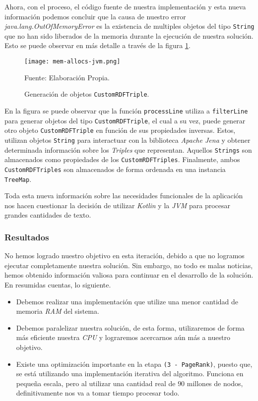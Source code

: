 Ahora, con el proceso, el código fuente de nuestra implementación y esta nueva información podemos concluir que la causa de nuestro error \textit{java.lang.OutOfMemoryError} es la existencia de multiples objetos del tipo \texttt{String} que no han sido liberados de la memoria durante la ejecución de nuestra solución. Esto se puede observar en más detalle a través de la figura \ref{fig:i2-prof-mem-allocs}.

\begin{figure}[ht]
    \centering
    \texttt{[image: mem-allocs-jvm.png]}
    \caption{Generación de objetos \texttt{CustomRDFTriple}.}Fuente: Elaboración Propia.
    \label{fig:i2-prof-mem-allocs}
\end{figure}

En la figura se puede observar que la función \texttt{processLine} utiliza a \texttt{filterLine} para generar objetos del tipo \texttt{CustomRDFTriple}, el cual a su vez, puede generar otro objeto \texttt{CustomRDFTriple} en función de sus propiedades inversas. Estos, utilizan objetos \texttt{String} para interactuar con la biblioteca \textit{Apache Jena} y obtener determinada información sobre los \textit{Triples} que representan. Aquellos \texttt{Strings} son almacenados como propiedades de los \texttt{CustomRDFTriples}. Finalmente, ambos \texttt{CustomRDFTriples} son almacenados de forma ordenada en una instancia \texttt{TreeMap}.

Toda esta nueva información sobre las necesidades funcionales de la aplicación nos hacen cuestionar la decisión de utilizar \textit{Kotlin} y la \textit{JVM} para procesar grandes cantidades de texto.

\subsubsection*{Resultados}

No hemos logrado nuestro objetivo en esta iteración, debido a que no logramos ejecutar completamente nuestra solución. Sin embargo, no todo es malas noticias, hemos obtenido información valiosa para continuar en el desarrollo de la solución. En resumidas cuentas, lo siguiente.

\begin{itemize}
    \item Debemos realizar una implementación que utilize una menor cantidad de memoria \textit{RAM} del sistema.
    \item Debemos paralelizar nuestra solución, de esta forma, utilizaremos de forma más eficiente nuestra \textit{CPU} y lograremos acercarnos aún más a nuestro objetivo.
    \item Existe una optimización importante en la etapa \texttt{(3 - PageRank)}, puesto que, se está utilizando una implementación iterativa del algoritmo. Funciona en pequeña escala, pero al utilizar una cantidad real de $90$ millones de nodos, definitivamente nos va a tomar tiempo procesar todo.
\end{itemize}

